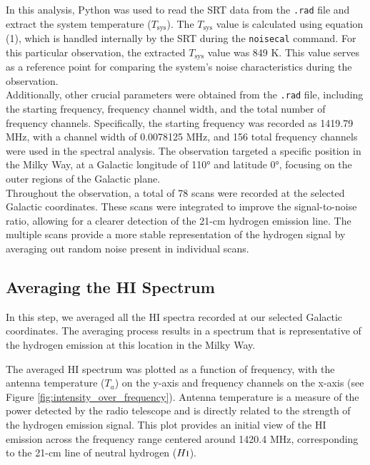 \documentclass[linenumbers,twocolumn]{aastex631}
\begin{document}
In this analysis, Python was used to read the SRT data from the \texttt{.rad} file and extract the system temperature ($T_{\text{sys}}$). The $T_{\text{sys}}$ value is calculated using equation (1), which is handled internally by the SRT during the \texttt{noisecal} command. For this particular observation, the extracted $T_{\text{sys}}$ value was 849 K. This value serves as a reference point for comparing the system's noise characteristics during the observation. \\

Additionally, other crucial parameters were obtained from the \texttt{.rad} file, including the starting frequency, frequency channel width, and the total number of frequency channels. Specifically, the starting frequency was recorded as 1419.79 MHz, with a channel width of 0.0078125 MHz, and 156 total frequency channels were used in the spectral analysis. The observation targeted a specific position in the Milky Way, at a Galactic longitude of 110° and latitude 0°, focusing on the outer regions of the Galactic plane. \\

Throughout the observation, a total of 78 scans were recorded at the selected Galactic coordinates. These scans were integrated to improve the signal-to-noise ratio, allowing for a clearer detection of the 21-cm hydrogen emission line. The multiple scans provide a more stable representation of the hydrogen signal by averaging out random noise present in individual scans.

\subsection{Averaging the HI Spectrum}

In this step, we averaged all the HI spectra recorded at our selected Galactic coordinates. The averaging process results in a spectrum that is representative of the hydrogen emission at this location in the Milky Way.

The averaged HI spectrum was plotted as a function of frequency, with the antenna temperature (\(T_a\)) on the y-axis and frequency channels on the x-axis (see Figure \ref{fig:intensity_over_frequency}). Antenna temperature is a measure of the power detected by the radio telescope and is directly related to the strength of the hydrogen emission signal. This plot provides an initial view of the HI emission across the frequency range centered around 1420.4 MHz, corresponding to the 21-cm line of neutral hydrogen (\(H\textsc{i}\)).
\end{document}
